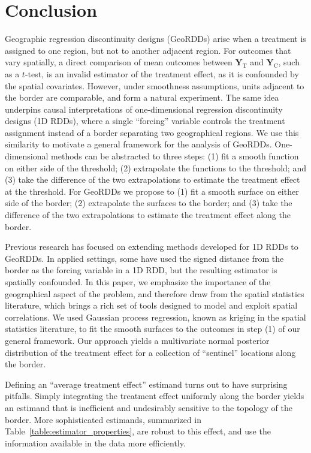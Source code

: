 \documentclass[letter,12pt]{article}
\newcommand{\treat}{\mathrm{T}}
\newcommand{\ctrol}{\mathrm{C}}
\newcommand{\Yvec}{\mathbold{Y}}
\newcommand{\yt}{\Yvec_{\treat}}
\newcommand{\yc}{\Yvec_{\ctrol}}
\begin{document}
\hypertarget{conclusion}{%
\section{Conclusion}\label{conclusion}}

Geographic regression discontinuity designs (GeoRDDs) arise when a treatment is assigned to one region, but not to another adjacent region.
For outcomes that vary spatially, a direct comparison of mean outcomes between \(\yt\) and \(\yc\), such as a \(t\)-test, is an invalid estimator of the treatment effect, as it is confounded by the spatial covariates.
However, under smoothness assumptions, units adjacent to the border are comparable, and form a natural experiment.
The same idea underpins causal interpretations of one-dimensional regression discontinuity designs (1D RDDs), where a single ``forcing'' variable controls the treatment assignment instead of a border separating two geographical regions.
We use this similarity to motivate a general framework for the analysis of GeoRDDs.
One-dimensional methods can be abstracted to three steps: (1) fit a smooth function on either side of the threshold; (2) extrapolate the functions to the threshold; and (3) take the difference of the two extrapolations to estimate the treatment effect at the threshold.
For GeoRDDs we propose to (1) fit a smooth surface on either side of the border; (2) extrapolate the surfaces to the border; and (3) take the difference of the two extrapolations to estimate the treatment effect along the border.

Previous research has focused on extending methods developed for 1D RDDs to GeoRDDs.
In applied settings, some have used the signed distance from the border as the forcing variable in a 1D RDD, but the resulting estimator is spatially confounded.
In this paper, we emphasize the importance of the geographical aspect of the problem, and therefore draw from the spatial statistics literature, which brings a rich set of tools designed to model and exploit spatial correlations.
We used Gaussian process regression, known as kriging in the spatial statistics literature, to fit the smooth surfaces to the outcomes in step (1) of our general framework.
Our approach yields a multivariate normal posterior distribution of the treatment effect for a collection of ``sentinel'' locations along the border.

Defining an ``average treatment effect'' estimand turns out to have surprising pitfalls.
Simply integrating the treatment effect uniformly along the border yields an estimand that is inefficient and undesirably sensitive to the topology of the border.
More sophisticated estimands, summarized in Table~\ref{table:estimator_properties}, are robust to this effect, and use the information available in the data more efficiently.
\end{document}
